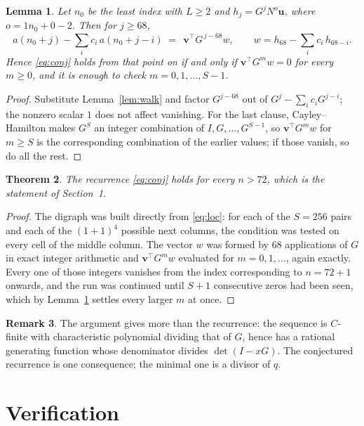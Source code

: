 \documentclass[11pt,a4paper]{article}
\theoremstyle{plain}
\newtheorem{theorem}{Theorem}
\newtheorem{lemma}[theorem]{Lemma}
\theoremstyle{definition}
\newtheorem{remark}[theorem]{Remark}
\begin{document}
\begin{lemma}\label{lem:crit}
Let $n_0$ be the least index with $L\ge2$ and $h_j=G^{j}N^{o}\mathbf{u}$, where
$o=1n_0+0-2$. Then for $j\ge68$,
\[
a(n_0+j)-\sum_i c_i\,a(n_0+j-i)\;=\;\,\mathbf{v}^{\!\top}G^{\,j-68}w,
\qquad w=h_{68}-\sum_i c_i\,h_{68-i} .
\]
Hence \eqref{eq:conj} holds from that point on if and only if
$\mathbf{v}^{\!\top}G^{m}w=0$ for every $m\ge0$, and it is enough to check
$m=0,1,\dots,S-1$.
\end{lemma}

\begin{proof}
Substitute Lemma~\ref{lem:walk} and factor $G^{j-68}$ out of
$G^{j}-\sum_ic_iG^{j-i}$; the nonzero scalar $1$ does not affect
vanishing. For the last clause, Cayley--Hamilton makes $G^{S}$ an integer combination of
$I,G,\dots,G^{S-1}$, so $\mathbf{v}^{\!\top}G^{m}w$ for $m\ge S$ is the corresponding
combination of the earlier values; if those vanish, so do all the rest.
\end{proof}

\begin{theorem}
The recurrence \eqref{eq:conj} holds for every $n>72$, which is the statement of
Section~1.
\end{theorem}

\begin{proof}
The digraph was built directly from \eqref{eq:loc}: for each of the $S=256$ pairs and each
of the $(1+1)^{4}$ possible next columns, the condition was tested on every cell of
the middle column. The vector $w$ was formed by $68$ applications of $G$ in exact integer
arithmetic and $\mathbf{v}^{\!\top}G^{m}w$ evaluated for $m=0,1,\dots$, again exactly.
Every one of those integers vanishes from the index corresponding to $n=72+1$ onwards,
and the run was continued until $S+1$ consecutive zeros had been seen, which by
Lemma~\ref{lem:crit} settles every larger $m$ at once.
\end{proof}

\begin{remark}
The argument gives more than the recurrence: the sequence is $C$-finite with characteristic
polynomial dividing that of $G$, hence has a rational generating function whose denominator
divides $\det(I-xG)$. The conjectured recurrence is one consequence; the minimal one is a
divisor of $q$.
\end{remark}

\section{Verification}
\end{document}
